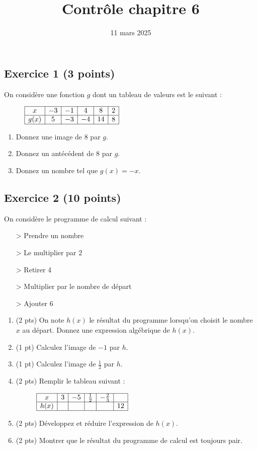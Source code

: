 \documentclass[14 pt, fleqn, pstricks]{extarticle}
\title{Contrôle chapitre 6}
\date{11 mars 2025}
\theoremstyle{plain}
\begin{document}
	 
	 \maketitle
\subsection*{Exercice 1 (3 points)}	 
	 
On considère une fonction $g$ dont un tableau de valeurs est le suivant : \begin{figure}[H]
\center
$\begin{array}{|c|c|c|c|c|c|}
\hline
 x &  -3 & -1 & 4 & 8  &  2 \\
\hline
g(x)&  5 & -3  & -4 & 14 &   8   \\
\hline
\end{array}$
\end{figure}	 

\begin{enumerate}
\item Donnez une image de $8$ par $g$. 
\item Donnez un antécédent de $8$ par $g$. 
\item Donnez un nombre tel que $g(x)= - x$.
\end{enumerate}


\subsection*{Exercice 2 (10 points) }	 
	 
On considère le programme de calcul suivant : 
\begin{itemize}
\item[>] Prendre un nombre
\item[>] Le multiplier par 2
\item[>] Retirer 4
\item[>] Multiplier par le nombre de départ 
\item[>] Ajouter 6
\end{itemize}
\begin{enumerate}
\item (2 pts) On note $h(x)$ le résultat du programme lorsqu'on choisit le nombre $x$ au départ. Donnez une expression algébrique de $h(x)$.
\item (1 pt) Calculez l'image de $-1$ par $h$. 
\item (1 pt) Calculez l'image de $\frac12$ par $h$.
\item (2 pts) Remplir le tableau suivant : 
	 
\begin{figure}[H]
\center
$\begin{array}{|c|c|c|c|c|c|}
\hline
 x &  3 & -5 & \frac12 &  -\frac23  &   \\
\hline
h(x)&   & & & & 12   \\
\hline
\end{array}$
\end{figure}
\item (2 pts) Développez et réduire l'expression de $h(x)$. \item (2 pts)  Montrer que le résultat du programme de calcul est toujours pair.
\end{enumerate} 
\end{document}
